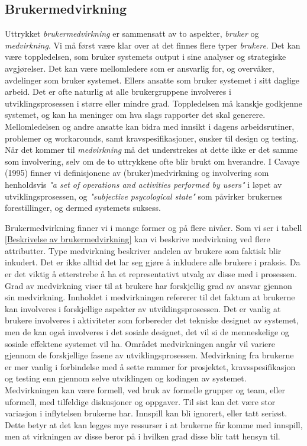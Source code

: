 \subsection{Brukermedvirkning}
\label{chp: medvirkning}

Uttrykket \emph{brukermedvirkning} er sammensatt av to aspekter, \emph{bruker} og \emph{medvirkning}.
Vi må først være klar over at det finnes flere typer \emph{brukere}. Det kan være toppledelsen, som bruker systemets output i sine analyser og strategiske avgjørelser. Det kan være mellomledere som er ansvarlig for, og overvåker, avdelinger som bruker systemet. Ellers ansatte som bruker systemet i sitt daglige arbeid. Det er ofte naturlig at alle brukergruppene involveres i utviklingsprosessen i større eller mindre grad. Toppledelsen må kanskje godkjenne systemet, og kan ha meninger om hva slags rapporter det skal generere. Mellomledelsen og andre ansatte kan bidra med innsikt i dagens arbeidsrutiner, problemer og workarounds, samt kravspesifikasjoner, ønsker til design og testing. Når det kommer til \emph{medvirkning} må det understrekes at dette ikke er det samme som involvering, selv om de to uttrykkene ofte blir brukt om hverandre. I Cavaye (1995) finner vi definisjonene av (bruker)medvirkning og involvering som henholdsvis \emph{"a set of operations and activities performed by users"} i løpet av utviklingsprosessen, og \emph{"subjective psycological state"} som påvirker brukernes forestillinger, og dermed systemets suksess.

\noindent
Brukermedvirkning finner vi i mange former og på flere nivåer. Som vi ser i tabell \ref{Beskrivelse av brukermedvirkning} kan vi beskrive medvirkning ved flere attributter. 
Type medvirkning beskriver andelen av brukere som faktisk blir inkudert. Det er ikke alltid det lar seg gjøre å inkludere alle brukere i praksis. Da er det viktig å etterstrebe å ha et representativt utvalg av disse med i prosessen. 
Grad av medvirkning viser til at brukere har forskjellig grad av ansvar gjennon sin medvirkning. 
Innholdet i medvirkningen refererer til det faktum at brukerne kan involveres i forskjellige aspekter av utviklingsprosessen. Det er vanlig at brukere involveres i aktiviteter som forbereder det tekniske designet av systemet, men de kan også involveres i det sosiale designet, det vil si de menneskelige og sosiale effektene systemet vil ha. 
Området medvirkningen angår vil variere gjennom de forskjellige fasene av utviklingsprosessen. Medvirkning fra brukerne er mer vanlig i forbindelse med å sette rammer for prosjektet, kravsspesifikasjon og testing enn gjennom selve utviklingen og kodingen av systemet. Medvirkningen kan være formell, ved bruk av formelle grupper og team, eller uformell, med tilfeldige diskusjoner og oppgaver. Til sist kan det være stor variasjon i  inflytelsen brukerne har. Innspill kan bli ignorert, eller tatt seriøst. Dette betyr at det kan legges mye ressurser i at brukerne får komme med innspill, men at virkningen av disse beror på i hvilken grad disse blir tatt hensyn til.

